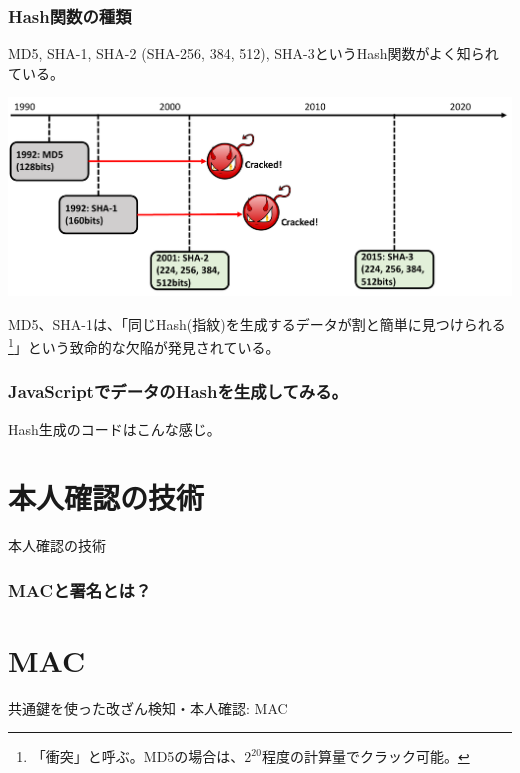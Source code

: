 \documentclass[12pt,dvipdfmx]{beamer}
\begin{document}
\begin{frame}
\frametitle{Hash関数の種類}
 MD5, SHA-1, SHA-2 (SHA-256, 384, 512), SHA-3というHash関数がよく知られている。
 \begin{center}
  \includegraphics[width=\linewidth]{Figs/hash-history.pdf}
 \end{center}
 MD5、SHA-1は、「\alert{同じHash(指紋)を生成するデータが割と簡単に見つけられる}\footnote[frame]{「衝突」と呼ぶ。MD5の場合は、$2^{20}$程度の計算量でクラック可能。}」という致命的な欠陥が発見されている。
\end{frame}

\begin{frame}
\frametitle{JavaScriptでデータのHashを生成してみる。}
\end{frame}

\begin{frame}
Hash生成のコードはこんな感じ。
\end{frame}
\section{本人確認の技術}
\begin{frame}
\centering
{\Large 本人確認の技術}
\end{frame}

\begin{frame}
\frametitle{MACと署名とは？}
\end{frame}


\section{MAC}
\begin{frame}
\centering

{\Large 共通鍵を使った改ざん検知・本人確認: MAC}

\end{frame}
\end{document}
